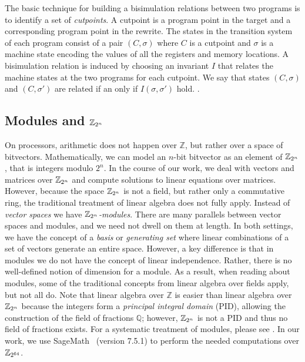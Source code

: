 The basic technique for building a bisimulation relations between two
programs is to identify a set of \emph{cutpoints}. A cutpoint is a
program point in the target and a corresponding program point in the
rewrite. The states in the transition system of each program consist
of a pair $(C, \sigma)$ where $C$ is a cutpoint and $\sigma$ is a
machine state encoding the values of all the registers and memory
locations. A bisimulation relation is induced by choosing an invariant
$I$ that relates the machine states at the two programs for each
cutpoint. We say that states $(C, \sigma)$ and $(C, \sigma')$ are
related if an only if $I(\sigma, \sigma')$ hold. . 


\subsection{Modules and $\mathbb{Z}_{2^{n}}$}

On processors, arithmetic does not happen over $\mathbb{Z}$, but
rather over a space of bitvectors. Mathematically, we can model
an $n$-bit bitvector as an element of $\mathbb{Z}_{2^{n}}$, that is integers
modulo $2^n$. In the course of our work, we deal with vectors and
matrices over $\mathbb{Z}_{2^{n}}$ and compute solutions to linear equations over
matrices. However, because the space $\mathbb{Z}_{2^{n}}$ is not a field, but
rather only a commutative ring, the traditional treatment of linear
algebra does not fully apply. Instead of \emph{vector spaces} we
have \emph{$\mathbb{Z}_{2^{n}}$-modules}. There are many parallels between vector
spaces and modules, and we need not dwell on them at length. In both
settings, we have the concept of a \emph{basis} or \emph{generating
set} where linear combinations of a set of vectors generate an
entire space. However, a key difference is that in modules we do
not have the concept of linear independence. Rather, there is no
well-defined notion of dimension for a module. As a result, when
reading about modules, some of the traditional concepts from linear
algebra over fields apply, but not all do. Note that linear algebra
over $\mathbb{Z}$ is easier than linear algebra over $\mathbb{Z}_{2^{n}}$ because
the integers form a \emph{principal integral domain} (PID), allowing
the construction of the field of fractions $\mathbb{Q}$; however,
$\mathbb{Z}_{2^{n}}$ is not a PID and thus no field of fractions exists. For a
systematic treatment of modules, please see . In
our work, we use SageMath~\cite{sagemath} (version 7.5.1)
to perform the needed computations over $\mathbb{Z}_{2^{64}}$.

